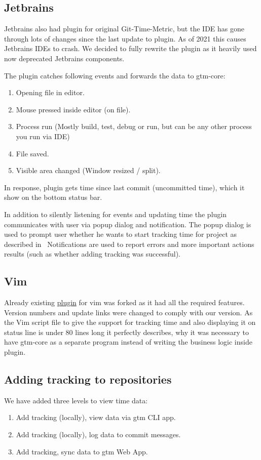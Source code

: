 \subsection{Jetbrains}\label{subsec:jetbrains-plugin}
Jetbrains also had plugin for original Git-Time-Metric, but the IDE has gone through lots of changes since the last update to plugin.
As of 2021 this causes Jetbrains IDEs to crash.
We decided to fully rewrite the plugin as it heavily used now deprecated Jetbrains components.

The plugin catches following events and forwards the data to gtm-core:
\begin{enumerate}
    \item Opening file in editor.
    \item Mouse pressed inside editor (on file).
    \item Process run (Mostly build, test, debug or run, but can be any other process you run via IDE)
    \item File saved.
    \item Visible area changed (Window resized / split).
\end{enumerate}

In response, plugin gets time since last commit (uncommitted time), which it show on the bottom status bar.

In addition to silently listening for events and updating time the plugin communicates with user via popup dialog and notification.
The popup dialog is used to prompt user whether he wants to start tracking time for project as described in~
Notifications are used to report errors and more important actions results (such as whether adding tracking was successful).

\subsection{Vim}\label{subsec:vim-plugin}
Already existing \href{https://github.com/git-time-metric/gtm-vim-plugin}{plugin} for vim was forked as it had all the required features.
Version numbers and update links were changed to comply with our version.
As the Vim script file to give the support for tracking time and also displaying it on status line is under 80 lines long
it perfectly describes, why it was necessary to have gtm-core as a separate program instead of writing the business logic inside plugin.


\subsection{Adding tracking to repositories}\label{subsec:adding-tracking}
We have added three levels to view time data:
\begin{enumerate}
    \item Add tracking (locally), view data via gtm CLI app.
    \item Add tracking (locally), log data to commit messages.
    \item Add tracking, sync data to gtm Web App.
\end{enumerate}

